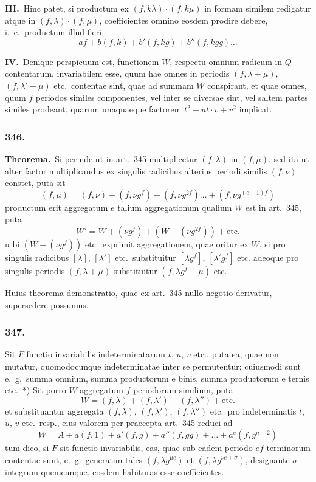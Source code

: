 \documentclass[12pt,a4paper]{article}
\theoremstyle{plain}
\theoremstyle{definition}
\theoremstyle{remark}
\begin{document}
\textbf{III.}\ Hinc patet, si productum ex $(f,k\lambda)\cdot(f,k\mu)$ in formam
similem redigatur atque in $(f,\lambda)\cdot(f,\mu)$, coefficientes omnino eosdem
prodire debere, i.\ e.\ productum illud fieri
\[af+b(f,k)+b'(f,kg)+b''(f,kgg)\dots\]

\textbf{IV.}\ Denique perspicuum est, functionem $W$, respectu omnium
radicum in $Q$ contentarum, invariabilem esse, quum hae omnes in
periodis $(f,\lambda+\mu)$, $(f,\lambda'+\mu)$ etc.\ contentae sint, quae ad summam
$W$ conspirant, et quae omnes, quum $f$ periodos similes componentes, vel
inter se diversae sint, vel saltem partes similes prodeant, quarum unaquaeque
factorem $t^2-ut\cdot v+v^2$ implicat.

\subsubsection*{346.}

\textbf{Theorema.}\ Si perinde ut in art.\ 345 multiplicetur $(f,\lambda)$ in
$(f,\mu)$, sed ita ut alter factor multiplicandus ex singulis radicibus
alterius periodi similis $(f,\nu)$ constet, puta sit
\[(f,\mu) = (f,\nu)+(f,\nu g^f)+(f,\nu g^{2f})\dots+(f,\nu g^{(e-1)f})\]
productum erit aggregatum $e$ talium aggregationum qualium $W$ est in
art.\ 345, puta
\[W' = W+(\nu g^f)+(W+(\nu g^{2f}))+\text{etc.}\]
u bi $(W+(\nu g^f))$ etc.\ exprimit aggregationem, quae oritur ex $W$, si pro
singulis radicibus $[\lambda]$, $[\lambda']$ etc.\ substituitur $[\lambda g^f]$, $[\lambda' g^f]$ etc.
adeoque pro singulis periodis $(f,\lambda+\mu)$ substituitur $(f,\lambda g^f+\mu)$ etc.

Huius theorema demonstratio, quae ex art.\ 345 nullo negotio derivatur,
supersedere possumus.

\subsubsection*{347.}

Sit $F$ functio invariabilis indeterminatarum $t$, $u$, $v$ etc., puta ea,
quae non mutatur, quomodocunque indeterminatae inter se permutentur;
cuiusmodi sunt e.\ g.\ summa omnium, summa productorum e binis,
summa productorum e ternis etc.\ *) Sit porro $W$ aggregatum $f$
periodorum similium, puta
\[W = (f,\lambda)+(f,\lambda')+(f,\lambda'')+\text{etc.}\]
et substituantur aggregata $(f,\lambda)$, $(f,\lambda')$, $(f,\lambda'')$ etc.\ pro
indeterminatis $t$, $u$, $v$ etc.\ resp., eius valorem per praecepta art.\ 345
reduci ad
\[W = A+a(f,1)+a'(f,g)+a''(f,gg)+\dots+a^e(f,g^{n-2})\]
tum dico, si $F$ sit functio invariabilis, eas, quae sub eadem periodo
$ef$ terminorum contentae sunt, e.\ g.\ generatim tales $(f,\lambda g^{\mu e})$ et
$(f,\lambda g^{\nu e+\sigma})$, designante $\sigma$ integrum quemcunque, eosdem habituras
esse coefficientes.
\end{document}
